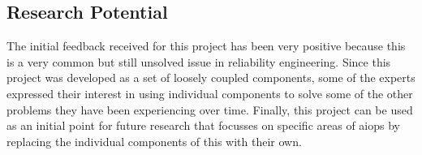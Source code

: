 \subsection{Research Potential}

The initial feedback received for this project has been very positive because this is a very common but still unsolved issue in reliability engineering. Since this project was developed as a set of loosely coupled components, some of the experts expressed their interest in using individual components to solve some of the other problems they have been experiencing over time. Finally, this project can be used as an initial point for future research that focusses on specific areas of \ac{aiops} by replacing the individual components of this with their own.